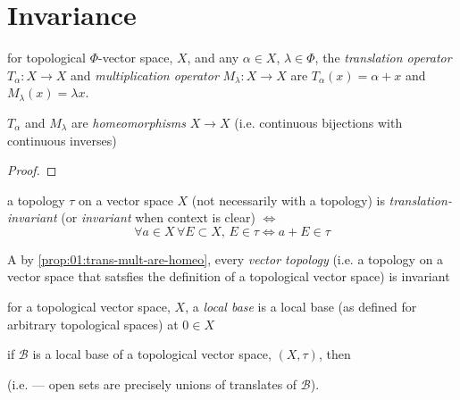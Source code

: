 \section{Invariance}
\begin{defn}
  for topological $\Phi$-vector space, $X$, and any ${\alpha\in X}$,
  ${\lambda\in\Phi}$, the \emph{translation operator}
  ${T_\alpha:X\rightarrow X}$ and \emph{multiplication operator}
  ${M_\lambda: X\rightarrow X}$ are ${T_\alpha(x) = \alpha + x}$
  and ${M_\lambda(x)=\lambda x}$.
\end{defn}

\begin{prop}\label{prop:01:trans-mult-are-homeo}
  $T_\alpha$ and $M_\lambda$ are \emph{homeomorphisms} ${X\rightarrow X}$
  (i.e. continuous bijections with continuous inverses)
\end{prop}
\begin{proof}
\end{proof}

\begin{defn}
  a topology $\tau$ on a vector space $X$
  (not necessarily with a topology)
  is \emph{translation-invariant} (or \emph{invariant} when
  context is clear) $\iff$
  \[
  \forall a\in X\,\forall E\subset X,\,
  E\in\tau \Leftrightarrow a+E\in\tau
  \]
\end{defn}

\begin{rem}{A}\label{rem:01:tvs-trans-invar}
  by \ref{prop:01:trans-mult-are-homeo}, every \emph{vector topology}
  (i.e. a topology on a vector space that satsfies the definition
  of a topological vector space) is invariant
\end{rem}

\begin{defn}
  for a topological vector space, $X$, a \emph{local base}
  is a local base (as defined for arbitrary topological spaces)
  at ${0\in X}$
\end{defn}

\begin{rem}{}
  if $\mathcal{B}$ is a local base of a topological vector space,
  ${(X,\tau)}$, then
  (i.e. --- open sets are precisely unions of translates of
  $\mathcal{B}$).
\end{rem}


